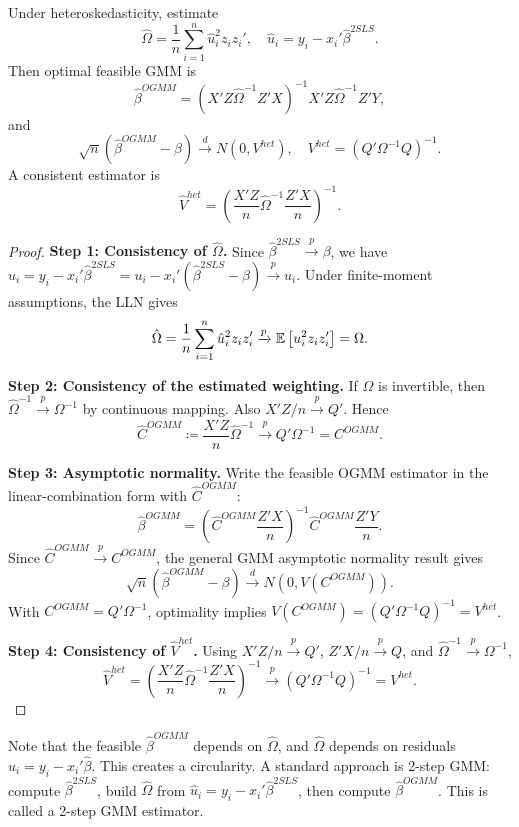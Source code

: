 \begin{proposition}
	Under heteroskedasticity, estimate \[
		\hat{\Omega} = \frac{1}{n}\sum_{i=1}^{n}\hat{u}_i^2 z_i z_i', \quad \hat{u}_i = y_i - x_i'\hat{\beta}^{2SLS}
	.\]
	Then optimal feasible GMM is \[
		\hat{\beta}^{OGMM} = (X'Z\hat{\Omega}^{-1}Z'X)^{-1}X'Z\hat{\Omega}^{-1}Z'Y
	,\]
	and \[
		\sqrt{n}(\hat{\beta}^{OGMM}-\beta) \xrightarrow{d} N(0,V^{het}), \quad V^{het} = (Q'\Omega^{-1}Q)^{-1}
	.\]
	A consistent estimator is \[
		\hat{V}^{het} = \left(\frac{X'Z}{n}\hat{\Omega}^{-1}\frac{Z'X}{n}\right)^{-1}
	.\]
\end{proposition}

\begin{proof}
	\textbf{Step 1: Consistency of $\hat{\Omega}$.} Since $\hat{\beta}^{2SLS}\xrightarrow{p}\beta$, we have $\hat{u}_i=y_i-x_i'\hat{\beta}^{2SLS}=u_i-x_i'(\hat{\beta}^{2SLS}-\beta)\xrightarrow{p}u_i$. Under finite-moment assumptions, the LLN gives
	\[
		\hat{\Omega}=\frac{1}{n}\sum_{i=1}^{n}\hat{u}_i^2 z_i z_i' \xrightarrow{p} \mathbb{E}\left[u_i^2 z_i z_i'\right]=\Omega
	.\]

	\textbf{Step 2: Consistency of the estimated weighting.} If $\Omega$ is invertible, then $\hat{\Omega}^{-1}\xrightarrow{p}\Omega^{-1}$ by continuous mapping. Also $X'Z/n\xrightarrow{p}Q'$. Hence
	\[
		\hat{C}^{OGMM}\coloneqq\frac{X'Z}{n}\hat{\Omega}^{-1}\xrightarrow{p}Q'\Omega^{-1}=C^{OGMM}
	.\]

	\textbf{Step 3: Asymptotic normality.} Write the feasible OGMM estimator in the linear-combination form with $\hat{C}^{OGMM}$:
	\[
		\hat{\beta}^{OGMM}=\left(\hat{C}^{OGMM}\frac{Z'X}{n}\right)^{-1}\hat{C}^{OGMM}\frac{Z'Y}{n}
	.\]
	Since $\hat{C}^{OGMM}\xrightarrow{p}C^{OGMM}$, the general GMM asymptotic normality result gives
	\[
		\sqrt{n}(\hat{\beta}^{OGMM}-\beta)\xrightarrow{d}N(0,V(C^{OGMM}))
	.\]
	With $C^{OGMM}=Q'\Omega^{-1}$, optimality implies $V(C^{OGMM})=(Q'\Omega^{-1}Q)^{-1}=V^{het}$.

	\textbf{Step 4: Consistency of $\hat{V}^{het}$.} Using $X'Z/n\xrightarrow{p}Q'$, $Z'X/n\xrightarrow{p}Q$, and $\hat{\Omega}^{-1}\xrightarrow{p}\Omega^{-1}$,
	\[
		\hat{V}^{het}=\left(\frac{X'Z}{n}\hat{\Omega}^{-1}\frac{Z'X}{n}\right)^{-1}\xrightarrow{p}(Q'\Omega^{-1}Q)^{-1}=V^{het}
	.\]
\end{proof}

Note that the feasible $\hat{\beta}^{OGMM}$ depends on $\hat{\Omega}$, and $\hat{\Omega}$ depends on residuals $\hat{u}_i = y_i - x_i'\hat{\beta}$. This creates a circularity. A standard approach is 2-step GMM: compute $\hat{\beta}^{2SLS}$, build $\hat{\Omega}$ from $\hat{u}_i = y_i - x_i'\hat{\beta}^{2SLS}$, then compute $\hat{\beta}^{OGMM}$.
This is called a 2-step GMM estimator.

